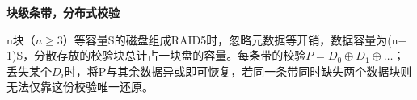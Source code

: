 {\color{ink}\bfseries 块级条带，分布式校验}\par\vspace{1bp}n块（\(n\ge 3\)）等容量S的磁盘组成RAID5时，忽略元数据等开销，数据容量为(n\(-\)1)S，分散存放的校验块总计占一块盘的容量。每条带的校验\(P=\allowbreak{}D_{0}\oplus D_{1}\oplus \ldots \)；丢失某个\(D_{i}\)时，将P与其余数据异或即可恢复，若同一条带同时缺失两个数据块则无法仅靠这份校验唯一还原。
